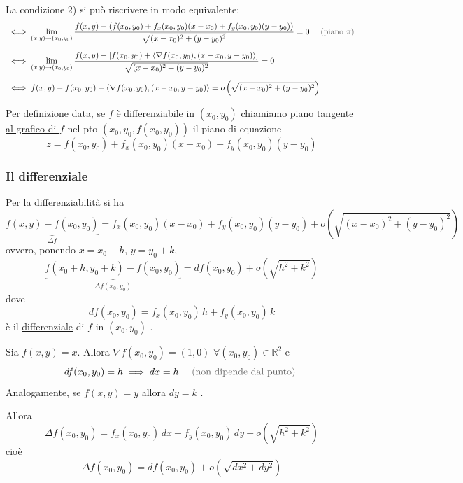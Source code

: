 La condizione 2) si può riscrivere in modo equivalente:
\begin{align*}
&\iff \lim_{(x, y) \to (x_0, y_0)} \frac{f(x, y) - \left( f(x_0, y_0) + f_x(x_0, y_0)(x - x_0) + f_y(x_0, y_0)(y - y_0) \right)}{\sqrt{(x - x_0)^2 + (y - y_0)^2}} = 0 \quad \text{\pencilnote{(piano $\pi$)}} \\[6pt]
&\iff \lim_{(x, y) \to (x_0, y_0)} \frac{f(x, y) - \left[ f(x_0, y_0) + \langle \nabla f(x_0, y_0), (x - x_0, y - y_0) \rangle \right]}{\sqrt{(x - x_0)^2 + (y - y_0)^2}} = 0 \\[6pt]
&\iff f(x, y) - f(x_0, y_0) - \langle \nabla f(x_0, y_0), (x - x_0, y - y_0) \rangle = o\left( \sqrt{(x - x_0)^2 + (y - y_0)^2} \right)
\end{align*}

\begin{definition}
Per definizione data, se $f$ è differenziabile in $(x_0, y_0)$ chiamiamo \underline{piano tangente al grafico di $f$} nel pto $(x_0, y_0, f(x_0, y_0))$ il piano di equazione
\[
z = f(x_0, y_0) + f_x(x_0, y_0)(x - x_0) + f_y(x_0, y_0)(y - y_0)
\]
\end{definition}

\subsubsection*{Il differenziale}

Per la differenziabilità si ha
\[
\underbrace{f(x, y) - f(x_0, y_0)}_{\Delta f} = f_x(x_0, y_0)(x - x_0) + f_y(x_0, y_0)(y - y_0) + o\left( \sqrt{(x - x_0)^2 + (y - y_0)^2} \right)
\]
ovvero, ponendo $x = x_0 + h$, $y = y_0 + k$,
\[
\underbrace{f(x_0 + h, y_0 + k) - f(x_0, y_0)}_{\Delta f(x_0, y_0)} = df(x_0, y_0) + o\left( \sqrt{h^2 + k^2} \right)
\]
dove
\[
df(x_0, y_0) = f_x(x_0, y_0)\, h + f_y(x_0, y_0)\, k
\]
è il \underline{differenziale} di $f$ in $(x_0, y_0)$ .

\begin{example}
Sia $f(x, y) = x$. Allora $\nabla f(x_0, y_0) = (1, 0)$ $\forall (x_0, y_0) \in \mathbb{R}^2$ e
\[
df(x_0, y_0) = h \implies dx = h \quad \text{\pencilnote{(non dipende dal punto)}}
\]
Analogamente, se $f(x, y) = y$ allora $dy = k$ .

Allora
\[
\Delta f(x_0, y_0) = f_x(x_0, y_0)\, dx + f_y(x_0, y_0)\, dy + o\left( \sqrt{h^2 + k^2} \right)
\]
cioè
\[
\Delta f(x_0, y_0) = df(x_0, y_0) + o\left( \sqrt{dx^2 + dy^2} \right)
\]
\end{example}

